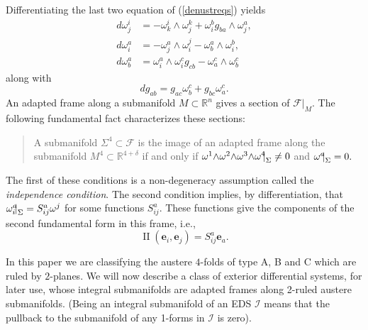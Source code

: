 \documentclass[12pt,reqno]{amsart}
\theoremstyle{definition}
\theoremstyle{remark}
\begin{document}
Differentiating the last two equation of   (\ref {denustreqs}) yields
\begin{equation}\label{dconn}
\begin{aligned}
d\omega^i_j &= -\omega^i_k\wedge \omega^k_j +\omega_i^b g_{ba}\wedge\omega_j^a,\\
d\omega^a_i &= -\omega^a_j\wedge \omega^j_i -\omega_b^a \wedge\omega_i^b,\\
d\omega^a_b &= \omega^a_i\wedge \omega^c_i g_{cb} -\omega_a^c \wedge\omega_b^c
\end{aligned}
\end{equation}
along with
\begin{equation}\label{diffg}
d g_{ab}= g_{ac}\omega^c_b+g_{bc}\omega^c_a.
\end{equation}
\indent An adapted frame along a submanifold $M \subset {\mathbb R}^n$ gives a section of ${\mathscr F}\vert_M$.
The following fundamental fact characterizes these sections:
\begin{quote}
A submanifold $\Sigma^4 \subset {\mathscr F}$
is the image of an adapted frame along the submanifold  $M^4 \subset {\mathbb R}^{4+\delta}$ if and only if
${\omega}^1 {\wedge} {\omega}^2 {\wedge} {\omega}^3 {\wedge} {\omega}^4{\negthickspace \mid}_\Sigma \ne 0$ and $\omega^a{\negthickspace \mid}_\Sigma=0.$
\end{quote}
The first of these conditions is a non-degeneracy assumption called the {\em independence condition}.
The second condition implies, by differentiation, that
$\omega^a_i {\negthickspace \mid}_\Sigma = S^a_{ij} {\omega}^j$
for some functions $S^a_{ij}$.  These functions give the components of
the second fundamental form in this frame, i.e.,
\begin{equation}\label{noose} {\operatorname{II}}({\mathbf e}_i, {\mathbf e}_j) = S^a_{ij} {\mathbf e}_a.
\end{equation}

In this paper we are classifying the austere $4$-folds of type A, B and C which are ruled by $2$-planes.
We will now describe a class of exterior differential systems, for later use,
whose integral submanifolds are adapted frames along 2-ruled austere submanifolds.
(Being an integral submanifold of an EDS ${{\mathcal I}}$ means that the pullback to the submanifold
of any 1-forms in ${{\mathcal I}}$ is zero).
\end{document}
